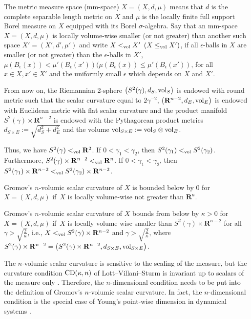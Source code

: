 \documentclass[10pt,a4paper]{amsart}
\begin{document}
 The metric measure space (mm-space) $X=(X,d,\mu)$ means that $d$ is the complete separable length metric on $X$ and $\mu$ is the locally finite full support Borel measure on $X$ equipped with its Borel $\sigma$-algebra. Say that an mm-space $X=(X,d,\mu)$ is locally volume-wise smaller (or not greater) than another such space $X'=(X',d',\mu')$ and write $X<_{\rm vol} X'$ $(X\leq_{\rm vol} X')$, if all $\epsilon$-balls in $X$ are smaller (or not greater) than the $\epsilon$-balls in $X'$, $\mu(B_{\epsilon}(x))<\mu'(B_{\epsilon}(x')) (\mu(B_{\epsilon}(x))\leq \mu'(B_{\epsilon}(x'))$, for all $x\in X, x'\in X'$ and the uniformly small $\epsilon$ which depends on $X$ and $ X'$.

From now on, the Riemannian 2-sphere $\big(S^2(\gamma),d_S, {\rm vol}_S\big)$ is endowed with round metric such that the scalar curvature equal to $2\gamma^{-2}$, $\big(\mathbf{R}^{n-2},d_E, {\rm vol}_E\big)$ is endowed with Euclidean metric with flat scalar curvature and the product manifold $S^2(\gamma)\times \mathbf{R}^{n-2}$ is endowed with the Pythagorean product metrics $d_{S\times E}:=\sqrt{d_S^2 + d_E^2}$ and the volume ${\rm vol}_{S\times E}:={\rm vol}_S \otimes {\rm vol}_E$.

Thus, we have $S^2(\gamma)<_{\rm vol} \mathbf{R}^2 $. If $0<\gamma_1< \gamma_2$, then $S^2(\gamma_1)<_{\rm vol} S^2(\gamma_2)$. Furthermore, $S^2(\gamma)\times \mathbf{R}^{n-2}<_{\rm vol} \mathbf{R}^n$. If $0<\gamma_1< \gamma_2$, then $S^2(\gamma_1)\times \mathbf{R}^{n-2}<_{\rm vol} S^2(\gamma_2)\times \mathbf{R}^{n-2}$.

\begin{Definition}
 Gromov's $n$-volumic scalar curvature of $X$ is bounded below by $0$ for $X=(X, d, \mu)$ if~$X$ is locally volume-wise not greater than $\mathbf{R}^n$.

 Gromov's $n$-volumic scalar curvature of $X$ bounds from below by $\kappa>0$ for $X=(X, d, \mu)$ if~$X$ is locally volume-wise smaller than $S^2(\gamma)\times \mathbf{R}^{n-2}$ for all $\gamma>\sqrt{\frac{2}{\kappa}}$, i.e., $X<_{\rm vol} S^2(\gamma)\times \mathbf{R}^{n-2}$ and $\gamma>\sqrt{\frac{2}{\kappa}}$, where $S^2(\gamma)\times \mathbf{R}^{n-2}=\big(S^2(\gamma)\times \mathbf{R}^{n-2},d_{S\times E},{\rm vol}_{S\times E}\big)$.
\end{Definition}

The $n$-volumic scalar curvature is sensitive to the scaling of the measure, but the curvature condition ${\rm CD}(\kappa, n)$ of Lott--Villani--Sturm \cite[Definition~1.3]{MR2237207} is invariant up to scalars of the measure only \cite[Proposition~1.4(ii)]{MR2237207}. Therefore, the $n$-dimensional condition needs to be put into the definition of Gromov's $n$-volumic scalar curvature. In fact, the $n$-dimensional condition is the special case of Young's point-wise dimension in dynamical systems \cite[Theorem~4.4]{MR684248}.
\end{document}
